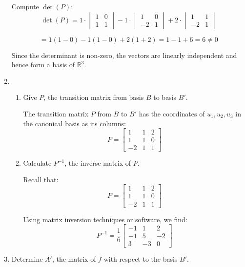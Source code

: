 \documentclass[12pt]{article}
\begin{document}
\begin{answerbox}
\begin{enumerate}
  Compute $ \det(P) $:
  $$
  \det(P) = 
  1 \cdot \begin{vmatrix} 1 & 0 \\ 1 & 1 \end{vmatrix}
  - 1 \cdot \begin{vmatrix} 1 & 0 \\ -2 & 1 \end{vmatrix}
  + 2 \cdot \begin{vmatrix} 1 & 1 \\ -2 & 1 \end{vmatrix}
  $$

  $$
  = 1(1 - 0) - 1(1 - 0) + 2(1 + 2) = 1 - 1 + 6 = 6 \neq 0
  $$

  Since the determinant is non-zero, the vectors are linearly independent and hence form a basis of $ \mathbb{R}^3 $.

  \item \begin{enumerate}
      \item Give $ P $, the transition matrix from basis $ B $ to basis $ B' $.

      The transition matrix $ P $ from $ B $ to $ B' $ has the coordinates of $ u_1, u_2, u_3 $ in the canonical basis as its columns:
      $$
      P = \begin{bmatrix}
      1 & 1 & 2 \\
      1 & 1 & 0 \\
      -2 & 1 & 1
      \end{bmatrix}
      $$

      \item Calculate $ P^{-1} $, the inverse matrix of $ P $.

      Recall that:
      $$
      P = \begin{bmatrix}
      1 & 1 & 2 \\
      1 & 1 & 0 \\
      -2 & 1 & 1
      \end{bmatrix}
      $$

      Using matrix inversion techniques or software, we find:
      $$
      P^{-1} = \frac{1}{6}
      \begin{bmatrix}
      -1 & 1 & 2 \\
      -1 & 5 & -2 \\
      3 & -3 & 0
      \end{bmatrix}
      $$
  \end{enumerate}

  \item Determine $ A' $, the matrix of $ f $ with respect to the basis $ B' $.


\end{enumerate}
\end{answerbox}
\end{document}
